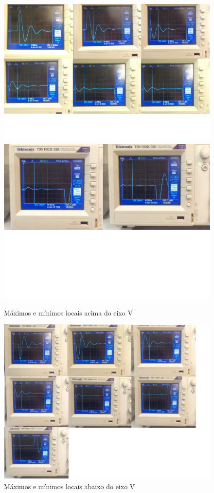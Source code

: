 \documentclass[12pt,letterpaper]{article}
\begin{document}
\begin{figure}[!htb]
  \centering
  \label{tabela}
  \includegraphics[scale=0.20]{img/a1v.png}
  \includegraphics[scale=0.38]{img/a2v.png}
  \caption{Máximos e mínimos locais acima do eixo V}
\end{figure}
\begin{figure}[!htb]
  \centering
  \label{tabela}
  \includegraphics[scale=0.20]{img/abixo.png}
  \caption{Máximos e mínimos locais abaixo do eixo V}
\end{figure}
\end{document}
